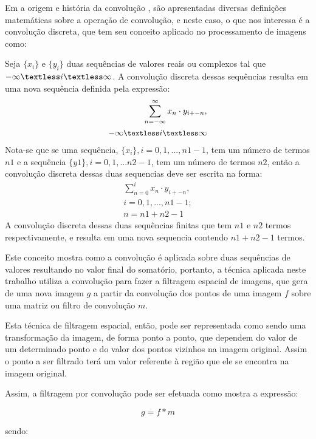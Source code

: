 Em a origem e história da convolução \cite{dominguez2010origin}, são apresentadas diversas definições matemáticas sobre a operação de convolução, e neste caso, o que nos interessa é a convolução discreta, que tem seu conceito aplicado no processamento de imagens como:

\begin{citacao}
Seja \(\{x_{i}\}\) e \(\{y_{i}\}\) duas sequências de valores reais ou complexos tal que \(-\infty \textless i \textless \infty\). A convolução discreta dessas sequências resulta em uma nova sequência definida pela expressão:
\[\begin{split}
\sum_{n=-\infty}^{\infty}x_{n} \cdot y_{i+-n}, \\ \small{-\infty \textless i \textless \infty}
\end{split}\] 
Nota-se que se uma sequência, \(\{x_{i}\}, i = 0, 1, ..., n1-1\), tem um número de termos \(n1\) e a sequência \(\{y1\}, i = 0, 1, ... n2-1\), tem um número de termos \(n2\), então a convolução discreta dessas duas sequencias deve ser escrita na forma:
\[\begin{split}
\sum_{n=0}^{i} x_{n} \cdot y_{i+-n}, \\i = 0, 1, ..., n1-1; \\n = n1 + n2 - 1
\end{split}\]
A convolução discreta dessas duas sequências finitas que tem \(n1\) e \(n2\) termos respectivamente, e resulta em uma nova sequencia contendo \(n1+n2-1\) termos. \cite{dominguez2010origin}
\end{citacao}

Este conceito mostra como a convolução é aplicada sobre duas sequências de valores resultando no valor final do somatório, portanto, a técnica aplicada neste trabalho utiliza a convolução para fazer a filtragem espacial de imagens, que gera de uma nova imagem \(g\) a partir da convolução dos pontos de uma imagem \(f\) sobre uma matriz ou filtro de convolução \(m\).

Esta técnica de filtragem espacial, então, pode ser representada como sendo uma transformação da imagem, de forma ponto a ponto, que dependem do valor de um determinado ponto e do valor dos pontos vizinhos na imagem original. Assim o ponto a ser filtrado terá um valor referente à região que ele se encontra na imagem original. 

Assim, a filtragem por convolução pode ser efetuada como mostra a expressão:

\[g = f * m\]

sendo:

